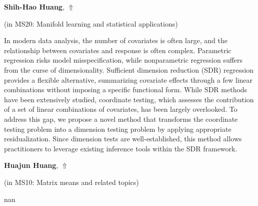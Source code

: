 \documentclass[ILAS2025-program.tex]{subfiles}
\begin{document}
     \hypertarget{down0040}{}\begin{ilasabstract}
    
    \textbf{Shih-Hao Huang},  \hfill \hyperlink{up0040}{$\Uparrow$}
    
    (in {\color{mstitle}MS20: Manifold learning and statistical applications})
        
        \mtskip
    In modern data analysis, the number of covariates is often large, and the relationship between covariates and response is often complex. Parametric regression risks model misspecification, while nonparametric regression suffers from the curse of dimensionality. Sufficient dimension reduction (SDR) regression provides a flexible alternative, summarizing covariate effects through a few linear combinations without imposing a specific functional form. While SDR methods have been extensively studied, coordinate testing, which assesses the contribution of a set of linear combinations of covariates, has been largely overlooked. To address this gap, we propose a novel method that transforms the coordinate testing problem into a dimension testing problem by applying appropriate residualization. Since dimension tests are well-established, this method allows practitioners to leverage existing inference tools within the SDR framework.
\end{ilasabstract}
     \hypertarget{down0133}{}\begin{ilasabstract}
    
    \textbf{Huajun Huang},  \hfill \hyperlink{up0133}{$\Uparrow$}
    
    (in {\color{mstitle}MS10: Matrix means and related topics})
        
        \mtskip
    nan\end{ilasabstract}
\end{document}
